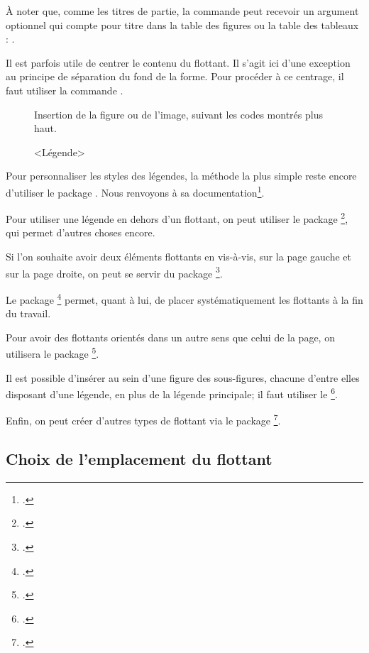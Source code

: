 À noter que, comme les titres de partie, la commande  peut recevoir un argument optionnel qui compte pour titre dans la table des figures ou la table des tableaux : 
. 


\begin{plusloins}

Il est parfois  utile de centrer le contenu du flottant. Il s'agit ici d'une exception au principe de séparation du fond de la forme. Pour procéder à ce centrage, il faut utiliser la commande .

\begin{latexcode}
\begin{figure}[<paramètre de placement>]
    \centering
    Insertion de la figure ou de l'image,
    suivant les codes montrés plus haut.
    \caption{<Légende>}
\end{figure} 
\end{latexcode}


Pour personnaliser les styles des légendes, la méthode la plus simple reste encore d'utiliser le package . Nous renvoyons à sa documentation\footcite{caption}.

Pour utiliser une légende en dehors d'un flottant, on peut utiliser le package \footcite{ccaption}, qui permet d'autres choses encore.

Si l'on souhaite avoir deux éléments flottants en vis-à-vis, sur la page gauche et sur la page droite, on peut  se servir du package \footcite{dpfloat}.

Le package \footcite{endfloat} permet, quant à lui, de placer systématiquement les flottants à la fin du travail.

Pour avoir des flottants orientés dans un autre sens que celui de la page, on utilisera le package \footcite{rotfloat}.

Il est possible d'insérer au sein d'une figure des sous-figures, chacune d'entre elles disposant d'une légende, en plus de la légende principale; il faut utiliser le  \footcite{subcaption}.

Enfin, on peut créer d'autres types de flottant via le package \footcite{float}.
\end{plusloins}



\subsection{Choix de l'emplacement du flottant}

